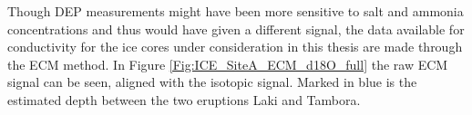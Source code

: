 \documentclass[../../CompleteThesis2/Complete_2ndDraft]{subfiles}
\begin{document}

Though DEP measurements might have been more sensitive to salt and ammonia concentrations and thus would have given a different signal, the data available for conductivity for the ice cores under consideration in this thesis are made through the ECM method. In Figure \ref{Fig:ICE_SiteA_ECM_d18O_full} the raw ECM signal can be seen, aligned with the isotopic signal. Marked in blue is the estimated depth between the two eruptions Laki and Tambora.





\end{document}
